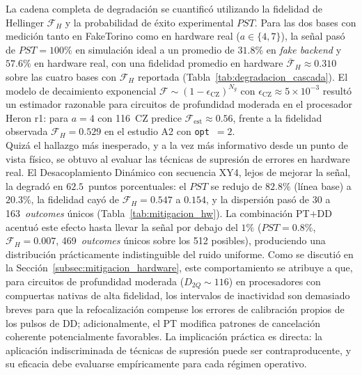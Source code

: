 \documentclass[12pt, spanish]{book}
\begin{document}
La cadena completa de degradación se cuantificó utilizando la fidelidad de Hellinger $\mathcal{F}_H$ y la probabilidad de éxito experimental $PST$. Para las dos bases con medición tanto en FakeTorino como en hardware real ($a \in \{4, 7\}$), la señal pasó de $PST = 100\%$ en simulación ideal a un promedio de $31.8\%$ en \textit{fake backend} y $57.6\%$ en hardware real, con una fidelidad promedio en hardware $\overline{\mathcal{F}}_H \approx 0.310$ sobre las cuatro bases con $\mathcal{F}_H$ reportada (Tabla~\ref{tab:degradacion_cascada}). El modelo de decaimiento exponencial $\mathcal{F} \sim (1 - \epsilon_{\text{CZ}})^{N_g}$ con $\epsilon_{\text{CZ}} \approx 5 \times 10^{-3}$ resultó un estimador razonable para circuitos de profundidad moderada en el procesador Heron r1: para $a = 4$ con 116~CZ predice $\mathcal{F}_{\text{est}} \approx 0.56$, frente a la fidelidad observada $\mathcal{F}_H = 0.529$ en el estudio A2 con \texttt{opt}~$=2$.\\

Quizá el hallazgo más inesperado, y a la vez más informativo desde un punto de vista físico, se obtuvo al evaluar las técnicas de supresión de errores en hardware real. El Desacoplamiento Dinámico con secuencia XY4, lejos de mejorar la señal, la degradó en $62.5$~puntos porcentuales: el $PST$ se redujo de $82.8\%$ (línea base) a $20.3\%$, la fidelidad cayó de $\mathcal{F}_H = 0.547$ a $0.154$, y la dispersión pasó de 30 a 163~\textit{outcomes} únicos (Tabla~\ref{tab:mitigacion_hw}). La combinación PT$+$DD acentuó este efecto hasta llevar la señal por debajo del $1\%$ ($PST = 0.8\%$, $\mathcal{F}_H = 0.007$, 469~\textit{outcomes} únicos sobre los 512 posibles), produciendo una distribución prácticamente indistinguible del ruido uniforme. Como se discutió en la Sección~\ref{subsec:mitigacion_hardware}, este comportamiento se atribuye a que, para circuitos de profundidad moderada ($D_{2Q} \sim 116$) en procesadores con compuertas nativas de alta fidelidad, los intervalos de inactividad son demasiado breves para que la refocalización compense los errores de calibración propios de los pulsos de DD; adicionalmente, el PT modifica patrones de cancelación coherente potencialmente favorables. La implicación práctica es directa: la aplicación indiscriminada de técnicas de supresión puede ser contraproducente, y su eficacia debe evaluarse empíricamente para cada régimen operativo.\\
\end{document}
